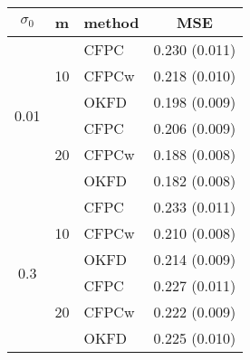 \begin{table}
	\begin{center}
		\begin{tabular}
			{|c|c|l|c|} \hline $\sigma_0$ & m & method & MSE \\
			\hline \multirow{6}{*}{0.01}& \multirow{3}{*}{10}
			  &CFPC&  0.230  (0.011)  \\
			& &CFPCw& 0.218  (0.010)  \\
			& &OKFD& 0.198  (0.009) \\
			\cline{2-4} & \multirow{3}{*}{20}
			  &CFPC& 0.206  (0.009) \\
			& &CFPCw&  0.188  (0.008)  \\
			& &OKFD& 0.182  (0.008)  \\
			\hline \multirow{6}{*}{0.3}& \multirow{3}{*}{10}
			  &CFPC& 0.233  (0.011)   \\
			& &CFPCw& 0.210  (0.008) \\
			& &OKFD& 0.214  (0.009)  \\
			\cline{2-4} & \multirow{3}{*}{20}
			  &CFPC& 0.227  (0.011)  \\
			& &CFPCw& 0.222  (0.009)  \\
			& &OKFD& 0.225  (0.010)  \\
			\hline
		\end{tabular}
	\label{tab:kriging_pred}
	\end{center}
\end{table}

